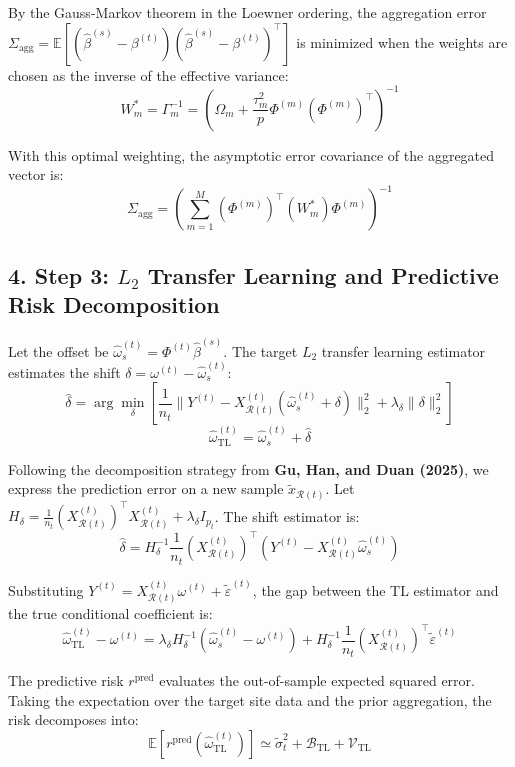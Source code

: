 \documentclass{article}
\begin{document}
By the Gauss-Markov theorem in the Loewner ordering, the aggregation error $\Sigma_{\mathrm{agg}} = \mathbb{E}[(\hat\beta^{(s)}-\beta^{(t)})(\hat\beta^{(s)}-\beta^{(t)})^\top]$ is minimized when the weights are chosen as the inverse of the effective variance:
\[
W_m^* = \Gamma_m^{-1} = \left( \Omega_m + \frac{\tau_m^2}{p} \Phi^{(m)}(\Phi^{(m)})^\top \right)^{-1}
\]

With this optimal weighting, the asymptotic error covariance of the aggregated vector is:
\[
\Sigma_{\mathrm{agg}} = \left( \sum_{m=1}^M (\Phi^{(m)})^\top (W_m^*) \Phi^{(m)} \right)^{-1}
\]

\subsection*{4. Step 3: $L_2$ Transfer Learning and Predictive Risk Decomposition}

Let the offset be $\hat\omega^{(t)}_s = \Phi^{(t)}\hat\beta^{(s)}$. The target $L_2$ transfer learning estimator estimates the shift $\delta = \omega^{(t)} - \hat\omega^{(t)}_s$:
\[
\hat\delta = \arg\min_{\delta} \left[ \frac{1}{n_t}\|Y^{(t)} - X^{(t)}_{\mathcal{R}(t)}(\hat\omega^{(t)}_s + \delta)\|_2^2 + \lambda_\delta\|\delta\|_2^2 \right]
\]
\[
\hat\omega_{\mathrm{TL}}^{(t)} = \hat\omega^{(t)}_s + \hat\delta
\]

Following the decomposition strategy from \textbf{Gu, Han, and Duan (2025)}, we express the prediction error on a new sample $\tilde{x}_{\mathcal{R}(t)}$. Let $H_\delta = \frac{1}{n_t}(X^{(t)}_{\mathcal{R}(t)})^\top X^{(t)}_{\mathcal{R}(t)} + \lambda_\delta I_{p_t}$. The shift estimator is:
\[
\hat\delta = H_\delta^{-1} \frac{1}{n_t} (X^{(t)}_{\mathcal{R}(t)})^\top (Y^{(t)} - X^{(t)}_{\mathcal{R}(t)}\hat\omega^{(t)}_s)
\]

Substituting $Y^{(t)} = X^{(t)}_{\mathcal{R}(t)}\omega^{(t)} + \tilde{\varepsilon}^{(t)}$, the gap between the TL estimator and the true conditional coefficient is:
\[
\hat\omega_{\mathrm{TL}}^{(t)} - \omega^{(t)} = \lambda_\delta H_\delta^{-1} (\hat\omega^{(t)}_s - \omega^{(t)}) + H_\delta^{-1} \frac{1}{n_t} (X^{(t)}_{\mathcal{R}(t)})^\top \tilde{\varepsilon}^{(t)}
\]

The predictive risk $r^{\mathrm{pred}}$ evaluates the out-of-sample expected squared error. Taking the expectation over the target site data and the prior aggregation, the risk decomposes into:
\[
\mathbb{E}[r^{\mathrm{pred}}(\hat\omega_{\mathrm{TL}}^{(t)})] \simeq \tilde{\sigma}_t^2 + \mathcal{B}_{\mathrm{TL}} + \mathcal{V}_{\mathrm{TL}}
\]
\end{document}
